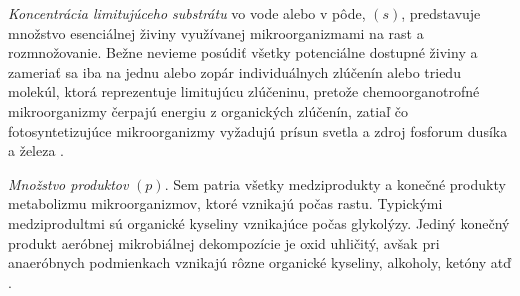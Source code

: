 \textit{Koncentrácia limitujúceho substrátu} vo vode alebo v pôde, $(s)$, predstavuje množstvo esenciálnej živiny využívanej mikroorganizmami na rast a rozmnožovanie. Bežne nevieme posúdiť všetky potenciálne dostupné živiny a zameriať sa iba na jednu alebo zopár individuálnych zlúčenín alebo triedu molekúl, ktorá reprezentuje limitujúcu zlúčeninu, pretože chemoorganotrofné mikroorganizmy čerpajú energiu z organických zlúčenín, zatiaľ čo fotosyntetizujúce mikroorganizmy vyžadujú prísun svetla a zdroj fosforum dusíka a železa \cite{ref2}.

\textit{Množstvo produktov} $(p)$. Sem patria všetky medziprodukty a konečné produkty metabolizmu mikroorganizmov, ktoré vznikajú počas rastu. Typickými medziprodultmi sú organické kyseliny vznikajúce počas glykolýzy. Jediný konečný produkt aeróbnej mikrobiálnej dekompozície je oxid uhličitý, avšak pri anaeróbnych podmienkach vznikajú rôzne organické kyseliny, alkoholy, ketóny atď \cite{ref2}. 

